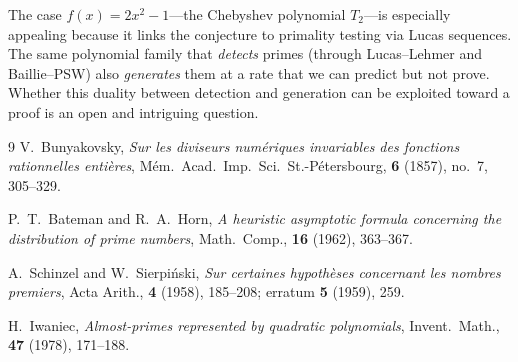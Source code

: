 \documentclass[11pt,a4paper]{article}
\begin{document}
The case $f(x) = 2x^2 - 1$---the Chebyshev polynomial $T_2$---is especially appealing because it links the conjecture to primality testing via Lucas sequences. The same polynomial family that \emph{detects} primes (through Lucas--Lehmer and Baillie--PSW) also \emph{generates} them at a rate that we can predict but not prove. Whether this duality between detection and generation can be exploited toward a proof is an open and intriguing question.

\begin{thebibliography}{9}
V.~Bunyakovsky, \emph{Sur les diviseurs num\'eriques invariables des fonctions rationnelles enti\`eres}, M\'em.\ Acad.\ Imp.\ Sci.\ St.-P\'etersbourg, \textbf{6} (1857), no.~7, 305--329.

P.~T.~Bateman and R.~A.~Horn, \emph{A heuristic asymptotic formula concerning the distribution of prime numbers}, Math.\ Comp., \textbf{16} (1962), 363--367.

A.~Schinzel and W.~Sierpi\'nski, \emph{Sur certaines hypoth\`eses concernant les nombres premiers}, Acta Arith., \textbf{4} (1958), 185--208; erratum \textbf{5} (1959), 259.

H.~Iwaniec, \emph{Almost-primes represented by quadratic polynomials}, Invent.\ Math., \textbf{47} (1978), 171--188.
\end{thebibliography}
\end{document}
